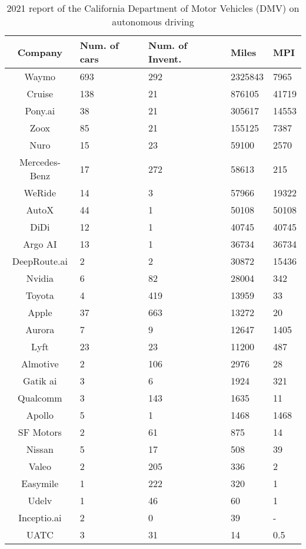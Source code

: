 
\begin{table}[!t]
	\footnotesize
	\caption{2021 report of the California Department of Motor Vehicles (DMV) on autonomous driving}
	\label{table:l4-mpi}
	\centering
	\begin{tabular}{c|llll}
		\hline\hline Company & Num. of cars & Num. of Invent. & Miles & MPI \\\hline
		Waymo & 693 & 292 & 2325843 & 7965 \\\hline
		Cruise & 138 & 21 & 876105 & 41719 \\\hline 
		Pony.ai & 38 & 21 & 305617 & 14553 \\\hline
		Zoox & 85 & 21 & 155125 & 7387 \\\hline 
		Nuro & 15 & 23 & 59100 & 2570 \\\hline
		Mercedes-Benz & 17 & 272 & 58613 & 215 \\\hline 
		WeRide & 14 & 3 & 57966 & 19322 \\\hline 
		AutoX & 44 & 1 & 50108 & 50108 \\\hline
		DiDi & 12 & 1 & 40745 & 40745 \\\hline 
		Argo AI & 13 & 1 & 36734 & 36734 \\\hline 
		DeepRoute.ai & 2 & 2 & 30872 & 15436 \\\hline 
		Nvidia & 6 & 82 & 28004 & 342 \\\hline 
		Toyota & 4 & 419 & 13959 & 33 \\\hline
		Apple & 37 & 663 & 13272 & 20 \\\hline 
		Aurora & 7 & 9 & 12647 & 1405 \\\hline 
		Lyft & 23 & 23 & 11200 & 487 \\\hline 
		Almotive & 2 &106 & 2976 & 28 \\\hline 
		Gatik ai & 3 & 6 & 1924 & 321 \\\hline 
		Qualcomm & 3 & 143 & 1635 & 11 \\\hline 
		Apollo & 5 & 1 & 1468 & 1468 \\\hline 
		SF Motors & 2 & 61 & 875 & 14 \\\hline 
		Nissan & 5 & 17 & 508 & 39 \\\hline 
		Valeo & 2 & 205 & 336 & 2 \\\hline 
		Easymile & 1 & 222 & 320 & 1 \\\hline
		Udelv & 1 & 46 & 60 & 1 \\\hline
		Inceptio.ai & 2 & 0 & 39 & - \\\hline 
		UATC & 3 & 31 & 14 & 0.5 \\\hline\hline
	\end{tabular}
\end{table}

